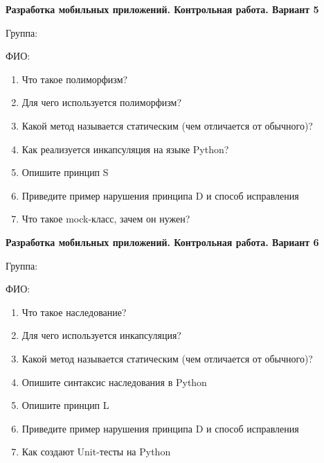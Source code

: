 \documentclass[12pt]{article}
\begin{document}
\vspace{40pt}\begin{minipage}{\textwidth}
\textbf{Разработка мобильных приложений. Контрольная работа. Вариант 5}

Группа: \underline{\hspace{3cm}}

ФИО: \underline{\hspace{10cm}}

\begin{enumerate}
\item Что такое полиморфизм?
\item Для чего используется полиморфизм?
\item Какой метод называется статическим (чем отличается от обычного)?
\item Как реализуется инкапсуляция на языке Python?
\item Опишите принцип S
\item Приведите пример нарушения принципа D и способ исправления
\item Что такое mock-класс, зачем он нужен?

\end{enumerate}
\end{minipage}

\vspace{40pt}\begin{minipage}{\textwidth}
\textbf{Разработка мобильных приложений. Контрольная работа. Вариант 6}

Группа: \underline{\hspace{3cm}}

ФИО: \underline{\hspace{10cm}}

\begin{enumerate}
\item Что такое наследование?
\item Для чего используется инкапсуляция?
\item Какой метод называется статическим (чем отличается от обычного)?
\item Опишите синтаксис наследования в Python
\item Опишите принцип L
\item Приведите пример нарушения принципа D и способ исправления
\item Как создают Unit-тесты на Python

\end{enumerate}
\end{minipage}
\end{document}
